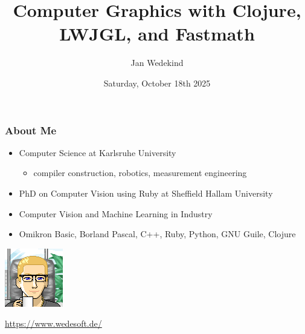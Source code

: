 \documentclass[aspectratio=169,11pt,xcolor=dvipsnames]{beamer}
\title{Computer Graphics with Clojure, LWJGL, and Fastmath}
\author{Jan Wedekind}
\date{Saturday, October 18th 2025}
\begin{document}
\begin{frame}
  \titlepage{}
\end{frame}

\begin{frame}
  \frametitle{About Me}
  \begin{minipage}[b]{0.79\textwidth}
    \begin{itemize}
      \item Computer Science at Karlsruhe University
        \begin{itemize}
          \item compiler construction, robotics, measurement engineering
        \end{itemize}
      \item PhD on Computer Vision using Ruby at Sheffield Hallam University
      \item Computer Vision and Machine Learning in Industry
      \item Omikron Basic, Borland Pascal, C++, Ruby, Python, GNU Guile, Clojure
    \end{itemize}
  \end{minipage}
  \begin{minipage}[b]{0.2\textwidth}
    \includegraphics[width=\textwidth]{avatar}\\
    \begin{tiny}
      \url{https://www.wedesoft.de/}
    \end{tiny}
  \end{minipage}
\end{frame}
\end{document}
